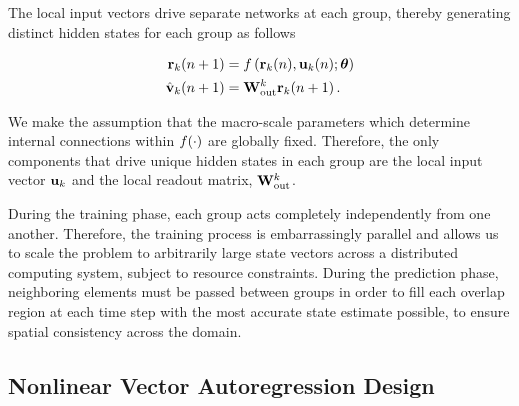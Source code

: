 \documentclass[draft]{agujournal2019}
\begin{document}
The local input vectors drive separate networks at each group, thereby generating distinct hidden states for each group as follows
\begin{linenomath*}\begin{equation}
    \begin{aligned}
        \mathbf{r}_{k}(n+1)
        &= f\left(
            \mathbf{r}_{k}(n), \mathbf{u}_{k}(n); \bm{\theta}
        \right) \\
        \hat{\mathbf{v}}_{k}(n+1)
        &= \mathbf{W}_\text{out}^{k} \mathbf{r}_{k}(n+1) \, .
    \end{aligned}
    \label{eq:local-rnn}
\end{equation}\end{linenomath*}
We make the assumption that the macro-scale parameters which determine internal
connections within $f(\cdot)$ are globally fixed.
Therefore, the only components
that drive unique hidden states in each group are the local input vector
$\mathbf{u}_{k}$ and the local readout matrix, $\mathbf{W}_\text{out}^{k}$.

During the training phase, each group acts completely independently from one
another.
Therefore, the training process is embarrassingly parallel and allows us to
scale the problem to arbitrarily large state vectors across a distributed
computing system, subject to resource constraints.
During the prediction phase, neighboring elements must be passed between
groups in order to fill each overlap region at each time step with the most accurate state estimate possible, to ensure spatial consistency across the domain.

\subsection{Nonlinear Vector Autoregression Design}
\label{subsec:nvar}
\end{document}
